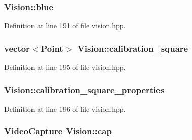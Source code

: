 \subsubsection[{\texorpdfstring{blue}{blue}}]{ Vision\+::blue\hspace{0.3cm}{\ttfamily [private]}}\hypertarget{class_vision_ae1f06c70a9065ce9daa2e6a8a8a828cb}{}\label{class_vision_ae1f06c70a9065ce9daa2e6a8a8a828cb}


Definition at line 191 of file vision.\+hpp.

\subsubsection[{\texorpdfstring{calibration\+\_\+square}{calibration_square}}]{\setlength{\rightskip}{0pt plus 5cm}vector$<$Point$>$ Vision\+::calibration\+\_\+square\hspace{0.3cm}{\ttfamily [private]}}\hypertarget{class_vision_adfd3934ada55ba839129af775429bda0}{}\label{class_vision_adfd3934ada55ba839129af775429bda0}


Definition at line 195 of file vision.\+hpp.

\subsubsection[{\texorpdfstring{calibration\+\_\+square\+\_\+properties}{calibration_square_properties}}]{ Vision\+::calibration\+\_\+square\+\_\+properties\hspace{0.3cm}{\ttfamily [private]}}\hypertarget{class_vision_a2a950746f88058af9260fd7ec5cddb5a}{}\label{class_vision_a2a950746f88058af9260fd7ec5cddb5a}


Definition at line 196 of file vision.\+hpp.

\subsubsection[{\texorpdfstring{cap}{cap}}]{\setlength{\rightskip}{0pt plus 5cm}Video\+Capture Vision\+::cap\hspace{0.3cm}{\ttfamily [private]}}\hypertarget{class_vision_a464b62371814a56a653a16641cbb80d2}{}\label{class_vision_a464b62371814a56a653a16641cbb80d2}


